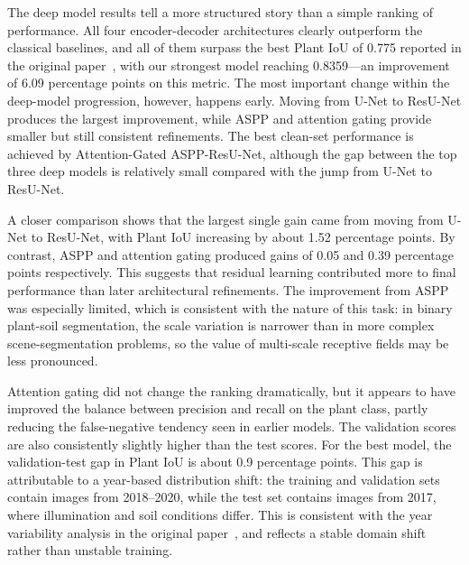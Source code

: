 \documentclass[conference]{IEEEtran}
\begin{document}
The deep model results tell a more structured story than a simple
ranking of performance. All four encoder-decoder architectures clearly
outperform the classical baselines, and all of them surpass the best
Plant IoU of 0.775 reported in the original paper~\cite{zenkl2022},
with our strongest model reaching 0.8359---an improvement of 6.09
percentage points on this metric. The most important change within the
deep-model progression, however, happens early. Moving from U-Net to
ResU-Net produces the largest improvement, while ASPP and attention
gating provide smaller but still consistent refinements. The best
clean-set performance is achieved by Attention-Gated ASPP-ResU-Net,
although the gap between the top three deep models is relatively small
compared with the jump from U-Net to ResU-Net.

A closer comparison shows that the largest single gain came from moving
from U-Net to ResU-Net, with Plant IoU increasing by about 1.52
percentage points. By contrast, ASPP and attention gating produced
gains of 0.05 and 0.39 percentage points respectively. This suggests
that residual learning contributed more to final performance than later
architectural refinements. The improvement from ASPP was especially
limited, which is consistent with the nature of this task: in binary
plant-soil segmentation, the scale variation is narrower than in more
complex scene-segmentation problems, so the value of multi-scale
receptive fields may be less pronounced.

Attention gating did not change the ranking dramatically, but it appears
to have improved the balance between precision and recall on the plant
class, partly reducing the false-negative tendency seen in earlier
models. The validation scores are also consistently slightly higher than
the test scores. For the best model, the validation-test gap in Plant
IoU is about 0.9 percentage points. This gap is attributable to a
year-based distribution shift: the training and validation sets contain
images from 2018--2020, while the test set contains images from 2017,
where illumination and soil conditions differ. This is consistent with
the year variability analysis in the original paper~\cite{zenkl2022},
and reflects a stable domain shift rather than unstable training.
\end{document}
